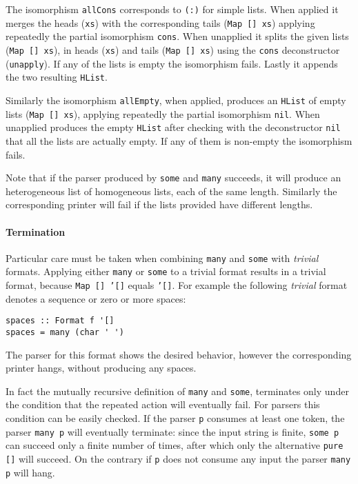 \documentclass[../Thesis.tex]{subfiles}
\begin{document}

The isomorphism \texttt{allCons} corresponds to \texttt{(:)} for simple lists.
When applied it merges the heads (\texttt{xs}) with the corresponding tails (\texttt{Map [] xs}) applying repeatedly the partial isomorphism \texttt{cons}.
When unapplied it splits the given lists (\texttt{Map [] xs}), in heads (\texttt{xs}) and tails (\texttt{Map [] xs}) using the \texttt{cons} deconstructor (\texttt{unapply}). If any of the lists is empty the isomorphism fails.
Lastly it appends the two resulting \texttt{HList}.

Similarly the isomorphism \texttt{allEmpty}, when applied, produces an \texttt{HList} of empty lists (\texttt{Map [] xs}), applying repeatedly the partial isomorphism \texttt{nil}. When unapplied produces the empty \texttt{HList} after checking with the deconstructor \texttt{nil} that all the lists are actually empty. If any of them is non-empty the isomorphism fails.

Note that if the parser produced by \texttt{some} and \texttt{many} succeeds, it will produce an heterogeneous list of homogeneous lists,
each of the same length. Similarly the corresponding printer will fail if the lists provided have different lengths.

\paragraph{Termination}
\label{par:Termination}
Particular care must be taken when combining \texttt{many} and \texttt{some}
with \emph{trivial} formats. Applying either \texttt{many} or \texttt{some} to a 
trivial format results in a trivial format, because \texttt{Map [] '[]} equals 
\texttt{'[]}. For example the following \emph{trivial} format denotes a 
sequence or zero or more spaces:
\begin{verbatim}
spaces :: Format f '[]
spaces = many (char ' ')
\end{verbatim}

The parser for this format shows the desired behavior, however the corresponding printer hangs, without producing any spaces.

In fact the mutually recursive definition of \texttt{many} and \texttt{some},  terminates only under
the condition that the repeated action will eventually fail.
For parsers this condition can be easily checked.
If the parser \texttt{p} consumes at least one token, the parser \texttt{many p} will eventually terminate: since the input string is finite, \texttt{some p} 
can succeed only a finite number of times, after which only the alternative \texttt{pure []} will succeed.
On the contrary if \texttt{p} does not consume any input the parser
\texttt{many p} will hang.
\end{document}
